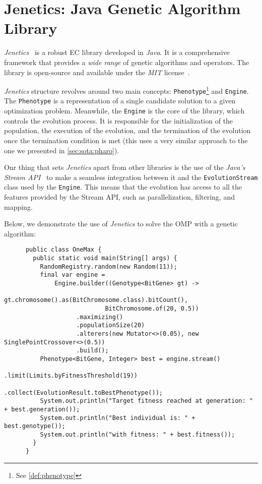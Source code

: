 \section{Jenetics: Java Genetic Algorithm Library}
\label{sec:sota:\textit{jenetics}}

  \emph{Jenetics}~\autocite{wilhelmstotterJeneticsJavaGenetica} is a robust
  EC library developed in \textit{Java}.
  It is a comprehensive framework that provides a \textit{wide range} of genetic
  algorithms and operators.
  The library is open-source and available under the \textit{MIT} 
  license~\autocite{MITLicense2006}.

  \textit{Jenetics} structure revolves around two main concepts: 
  \texttt{Phenotype}\footnote{See \vref{def:phenotype}} and \texttt{Engine}.
  The \texttt{Phenotype} is a representation of a single candidate solution to
  a given optimization problem.
  Meanwhile, the \texttt{Engine} is the core of the library, which controls the
  evolution process.
  It is responsible for the initialization of the population, the execution of
  the evolution, and the termination of the evolution once the termination
  condition is met (this uses a very similar approach to the one we presented 
  in \vref{sec:sota:pharo}).

  Onr thing that sets \textit{Jenetics} apart from other libraries is the use 
  of the \textit{Java's Stream API}~\autocite{StreamJavaPlatform} to make a 
  seamless integration between it and the \texttt{EvolutionStream} class used 
  by the \texttt{Engine}.
  This means that the evolution has access to all the features provided by the
  Stream API, such as parallelization, filtering, and mapping.

  Below, we demonstrate the use of \textit{Jenetics} to solve the OMP with a 
  genetic algorithm:

    \begin{verbatim}
      public class OneMax {
        public static void main(String[] args) {
          RandomRegistry.random(new Random(11));
          final var engine =
              Engine.builder((Genotype<BitGene> gt) ->
                                gt.chromosome().as(BitChromosome.class).bitCount(),
                            BitChromosome.of(20, 0.5))
                    .maximizing()
                    .populationSize(20)
                    .alterers(new Mutator<>(0.05), new SinglePointCrossover<>(0.5))
                    .build();
          Phenotype<BitGene, Integer> best = engine.stream()
                                                   .limit(Limits.byFitnessThreshold(19))
                                                   .collect(EvolutionResult.toBestPhenotype());
          System.out.println("Target fitness reached at generation: " + best.generation());
          System.out.println("Best individual is: " + best.genotype());
          System.out.println("with fitness: " + best.fitness());
        }
      }
    \end{verbatim}

